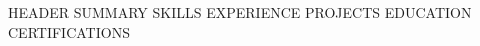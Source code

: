 \documentclass[10pt,letterpaper]{article}
\begin{document}
{{HEADER}}
{{SUMMARY}}
{{SKILLS}}
{{EXPERIENCE}}
{{PROJECTS}}
{{EDUCATION}}
{{CERTIFICATIONS}}
\end{document}
